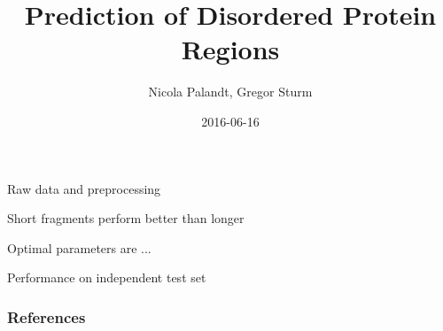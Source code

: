 \documentclass{beamer}
\title[disorder prediction]{Prediction of Disordered Protein Regions}
\subtitle{}
\date{2016-06-16}
\author{Nicola Palandt, Gregor Sturm}
\institute[rostlab]{Rostlab, Technical University of Munich}
\begin{document}
\maketitle

\begin{frame}{Raw data and preprocessing}

\end{frame}

\begin{frame}{Short fragments perform better than longer}

\end{frame}

\begin{frame}{Optimal parameters are ...}

\end{frame}

\begin{frame}{Performance on independent test set}

\end{frame}



\begin{frame}[allowframebreaks]
\frametitle{References}
\printbibliography
\end{frame}
\end{document}
